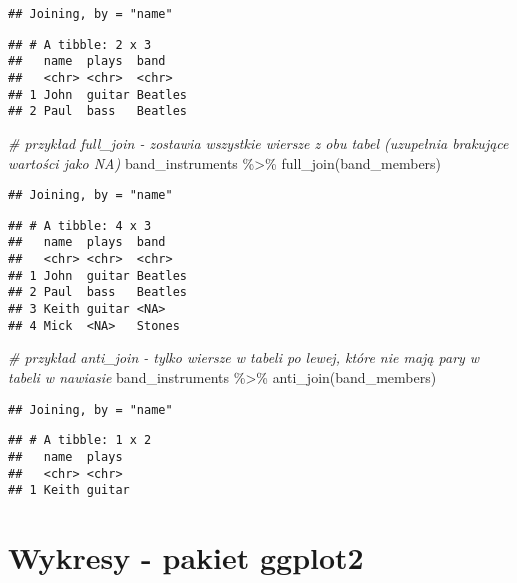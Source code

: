 \documentclass[
]{book}
\newenvironment{Shaded}{\begin{snugshade}}{\end{snugshade}}
\newcommand{\CommentTok}[1]{\textcolor[rgb]{0.56,0.35,0.01}{\textit{#1}}}
\newcommand{\FunctionTok}[1]{\textcolor[rgb]{0.00,0.00,0.00}{#1}}
\newcommand{\NormalTok}[1]{#1}
\newcommand{\SpecialCharTok}[1]{\textcolor[rgb]{0.00,0.00,0.00}{#1}}
\begin{document}
\begin{verbatim}
## Joining, by = "name"
\end{verbatim}

\begin{verbatim}
## # A tibble: 2 x 3
##   name  plays  band   
##   <chr> <chr>  <chr>  
## 1 John  guitar Beatles
## 2 Paul  bass   Beatles
\end{verbatim}

\begin{Shaded}
\begin{Highlighting}[]
\CommentTok{\# przykład full\_join {-} zostawia wszystkie wiersze z obu tabel (uzupełnia brakujące wartości jako NA)}
\NormalTok{band\_instruments }\SpecialCharTok{\%\textgreater{}\%} \FunctionTok{full\_join}\NormalTok{(band\_members)}
\end{Highlighting}
\end{Shaded}

\begin{verbatim}
## Joining, by = "name"
\end{verbatim}

\begin{verbatim}
## # A tibble: 4 x 3
##   name  plays  band   
##   <chr> <chr>  <chr>  
## 1 John  guitar Beatles
## 2 Paul  bass   Beatles
## 3 Keith guitar <NA>   
## 4 Mick  <NA>   Stones
\end{verbatim}

\begin{Shaded}
\begin{Highlighting}[]
\CommentTok{\# przykład anti\_join {-} tylko wiersze w tabeli po lewej, które nie mają pary w tabeli w nawiasie}
\NormalTok{band\_instruments }\SpecialCharTok{\%\textgreater{}\%} \FunctionTok{anti\_join}\NormalTok{(band\_members)}
\end{Highlighting}
\end{Shaded}

\begin{verbatim}
## Joining, by = "name"
\end{verbatim}

\begin{verbatim}
## # A tibble: 1 x 2
##   name  plays 
##   <chr> <chr> 
## 1 Keith guitar
\end{verbatim}

\hypertarget{wykresy---pakiet-ggplot2}{%
\chapter{Wykresy - pakiet ggplot2}\label{wykresy---pakiet-ggplot2}}
\end{document}
